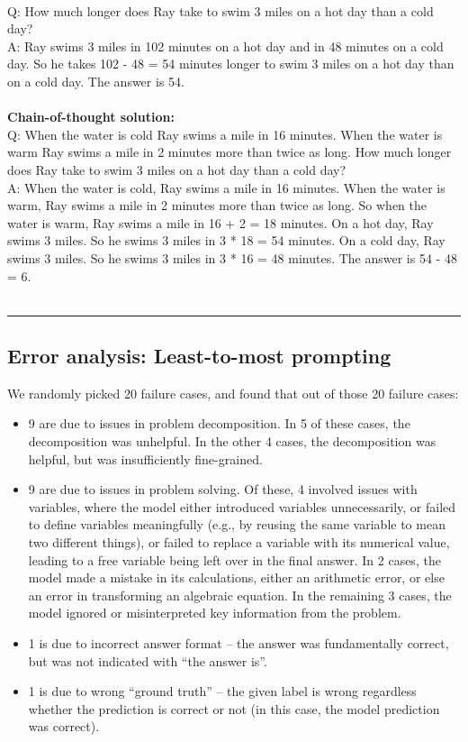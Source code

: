  \\
Q: How much longer does Ray take to swim 3 miles on a hot day than a cold day? \\
A: Ray swims 3 miles in 102 minutes on a hot day and in 48 minutes on a cold day. So he takes 102 - 48 = 54 minutes longer to swim 3 miles on a hot day than on a cold day. The answer is 54. \\
 \\
\textbf{Chain-of-thought solution:} \\
Q: When the water is cold Ray swims a mile in 16 minutes. When the water is warm Ray swims a mile in 2 minutes more than twice as long. How much longer does Ray take to swim 3 miles on a hot day than a cold day? \\
A: When the water is cold, Ray swims a mile in 16 minutes. When the water is warm, Ray swims a mile in 2 minutes more than twice as long. So when the water is warm, Ray swims a mile in 16 + 2 = 18 minutes. On a hot day, Ray swims 3 miles. So he swims 3 miles in 3 * 18 = 54 minutes. On a cold day, Ray swims 3 miles. So he swims 3 miles in 3 * 16 = 48 minutes. The answer is 54 - 48 = 6. \\
 \\
\hrule \bigskip

\subsection{Error analysis: Least-to-most prompting}
\label{app:gsm8k-error-analysis}

We randomly picked 20 failure cases, and found that out of those 20 failure cases:
\begin{itemize}
    \item 9 are due to issues in problem decomposition. In 5 of these cases, the decomposition was unhelpful. In the other 4 cases, the decomposition was helpful, but was insufficiently fine-grained.
    \item 9 are due to issues in problem solving. Of these, 4 involved issues with variables, where the model either introduced variables unnecessarily, or failed to define variables meaningfully (e.g., by reusing the same variable to mean two different things), or failed to replace a variable with its numerical value, leading to a free variable being left over in the final answer. In 2 cases, the model made a mistake in its calculations, either an arithmetic error, or else an error in transforming an algebraic equation. In the remaining 3 cases, the model ignored or misinterpreted key information from the problem.
    \item 1 is due to incorrect answer format -- the answer was fundamentally correct, but was not indicated with ``the answer is''.
    \item 1 is due to wrong ``ground truth'' -- the given label is wrong regardless whether the prediction is correct or not (in this case, the model prediction was correct).
\end{itemize}

